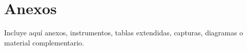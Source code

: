 \chapter{Anexos}

Incluye aquí anexos, instrumentos, tablas extendidas, capturas, diagramas o material complementario.
